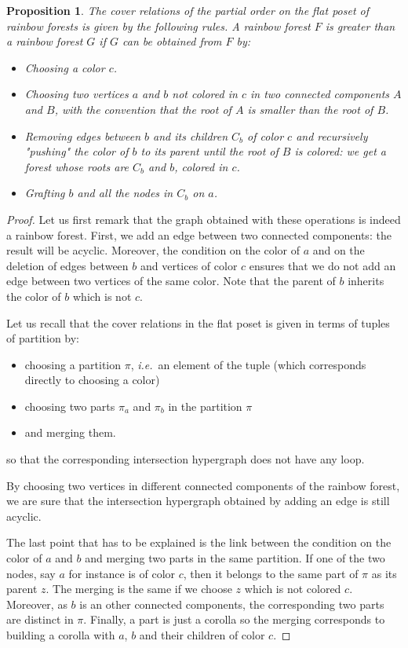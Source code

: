 \documentclass{amsart}
\newtheorem{proposition}[theorem]{Proposition}
\theoremstyle{definition}
\newcommand{\ie}{\textit{i.e.}~} %
\begin{document}
\begin{proposition}
The cover relations of the partial order on the flat poset of rainbow forests is given by the following rules. A rainbow forest $F$ is greater than a rainbow forest $G$ if $G$ can be obtained from $F$ by:
\begin{itemize}
\item Choosing a color $c$.
\item Choosing two vertices $a$ and $b$ not colored in $c$ in two connected components $A$ and $B$, with the convention that the root of $A$ is smaller than the root of $B$.
\item Removing edges between $b$ and its children $C_b$ of color $c$ and recursively "pushing" the color of $b$ to its parent until the root of $B$ is colored: we get a forest whose roots are $C_b$ and $b$, colored in $c$.
\item Grafting $b$ and all the nodes in $C_b$ on $a$.
\end{itemize}
\end{proposition}

\begin{proof}
Let us first remark that the graph obtained with these operations is indeed a rainbow forest. First, we add an edge between two connected components: the result will be acyclic. Moreover, the condition on the color of $a$ and on the deletion of edges between $b$ and vertices of color $c$ ensures that we do not add an edge between two vertices of the same color. Note that the parent of $b$ inherits the color of $b$ which is not $c$.

Let us recall that the cover relations in the flat poset is given in terms of tuples of partition by:
\begin{itemize}
\item choosing a partition $\pi$, \ie an element of the tuple (which corresponds directly to choosing a color)
\item choosing two parts $\pi_a$ and $\pi_b$ in the partition $\pi$
\item and merging them.
\end{itemize}
so that the corresponding intersection hypergraph does not have any loop.

By choosing two vertices in different connected components of the rainbow forest, we are sure that the intersection hypergraph obtained by adding an edge is still acyclic.

The last point that has to be explained is the link between the condition on the color of $a$ and $b$ and merging two parts in the same partition. If one of the two nodes, say $a$ for instance is of color $c$, then it belongs to the same part of $\pi$ as its parent $z$. The merging is the same if we choose $z$ which is not colored $c$. Moreover, as $b$ is an other connected components, the corresponding two parts are distinct in $\pi$. Finally, a part is just a corolla so the merging corresponds to building a corolla with $a$, $b$ and their children of color $c$.
\end{proof}
\end{document}
